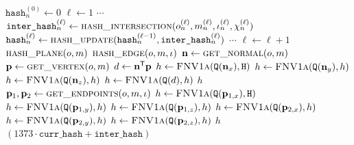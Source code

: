 \begin{algorithm}
    \begin{center}
    \begin{algorithmic}[1]
        \State $\texttt{hash}_n^{(0)} \gets 0$
        \State $\ell \gets 1$
         
            \State $\cdots$
            \State $\texttt{inter\_hash}_{n}^{(\ell)} \gets \Call{hash\_intersection}{o_n^{(\ell)}, m_n^{(\ell)}, \iota_n^{(\ell)}, \chi_n^{(\ell)}}$
            \State $\texttt{hash}_n^{(\ell)} \gets \Call{hash\_update}{\texttt{hash}_n^{(\ell-1)}, \texttt{inter\_hash}_{n}^{(\ell)}}$
            \State $\cdots$
            \State $\ell \gets \ell + 1$
        \EndWhile
        \State
            \If{$\chi = \Rc$}
                \Return $\Call{hash\_plane}{o,m}$
            \ElsIf{$\chi = \Dc$}
                \Return $\Call{hash\_edge}{o,m, \iota}$
            \EndIf
        \EndProcedure
        \State
            \State $\nv \gets \Call{get\_normal}{o, m}$ 
            \State $\pv \gets \Call{get\_vertex}{o, m}$ 
            \State $d \gets \mathbf{n}^{\mathsf{T}} \mathbf{p}$ 
            \State $h \gets \Call{FNV1a}{\texttt{Q}(\nv_x), \texttt{H}}$
            \State $h \gets \Call{FNV1a}{\texttt{Q}(\nv_y), h}$
            \State $h \gets \Call{FNV1a}{\texttt{Q}(\nv_z), h}$
            \State $h \gets \Call{FNV1a}{\texttt{Q}(d), h}$
            \State \Return $h$
        \EndProcedure
        \State
            \State $\pv_1, \pv_2 \gets \Call{get\_endpoints}{o, m, \iota}$ 
            \State $h \gets \Call{FNV1a}{\texttt{Q}(\pv_{1,x}), \texttt{H}}$
            \State $h \gets \Call{FNV1a}{\texttt{Q}(\pv_{1,y}), h}$
            \State $h \gets \Call{FNV1a}{\texttt{Q}(\pv_{1,z}), h}$
            \State $h \gets \Call{FNV1a}{\texttt{Q}(\pv_{2,x}), h}$
            \State $h \gets \Call{FNV1a}{\texttt{Q}(\pv_{2,y}), h}$
            \State $h \gets \Call{FNV1a}{\texttt{Q}(\pv_{2,z}), h}$
            \State \Return $h$
        \EndProcedure
        \State
            \State \Return $(1373 \cdot \texttt{curr\_hash} + \texttt{inter\_hash})$ 
        \EndProcedure
    \end{algorithmic}
    \caption{Hashing of specular chains\label{alg:path-solver-hashing}}
    \end{center}
\end{algorithm}

